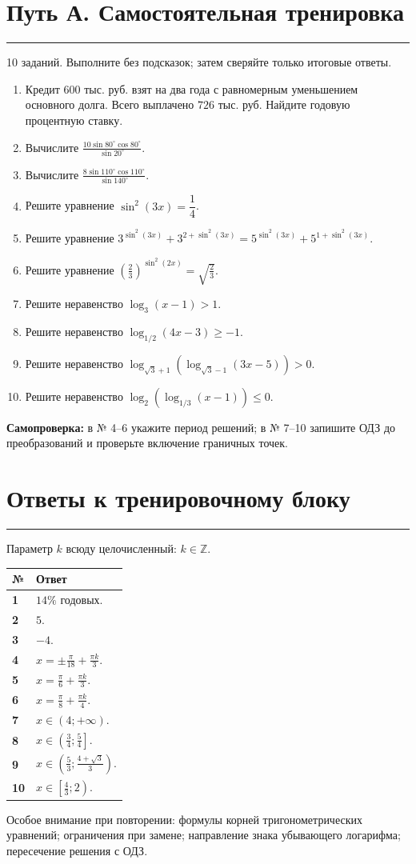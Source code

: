 \documentclass[a4paper,12pt]{article}
\newcommand{\sectionnote}[1]{{\small\color{softgray}#1\par}}
\newcommand{\lessonsection}[1]{\Needspace{5\baselineskip}\section*{\color{darkaccent}#1}\vspace{-5pt}\noindent\textcolor{accent}{\rule{25mm}{0.7pt}}\par\vspace{1pt}}
\newcommand{\Z}{\mathbb Z}
\begin{document}
\clearpage
\lessonsection{Путь А. Самостоятельная тренировка}
\sectionnote{10 заданий. Выполните без подсказок; затем сверяйте только итоговые ответы.}
\begin{enumerate}
\item Кредит \(600\) тыс. руб. взят на два года с равномерным уменьшением основного долга. Всего выплачено \(726\) тыс. руб. Найдите годовую процентную ставку.
\item Вычислите \(\displaystyle\frac{10\sin80^\circ\cos80^\circ}{\sin20^\circ}\).
\item Вычислите \(\displaystyle\frac{8\sin110^\circ\cos110^\circ}{\sin140^\circ}\).
\item Решите уравнение \(\sin^2(3x)=\dfrac14\).
\item Решите уравнение \(3^{\sin^2(3x)}+3^{2+\sin^2(3x)}=5^{\sin^2(3x)}+5^{1+\sin^2(3x)}\).
\item Решите уравнение \(\displaystyle\left(\frac23\right)^{\sin^2(2x)}=\sqrt{\frac23}\).
\item Решите неравенство \(\log_3(x-1)>1\).
\item Решите неравенство \(\log_{1/2}(4x-3)\ge-1\).
\item Решите неравенство \(\displaystyle\log_{\sqrt3+1}\!\left(\log_{\sqrt3-1}(3x-5)\right)>0\).
\item Решите неравенство \(\displaystyle\log_2\!\left(\log_{1/3}(x-1)\right)\le0\).
\end{enumerate}
\vspace{3mm}
\textbf{Самопроверка:} в № 4--6 укажите период решений; в № 7--10 запишите ОДЗ до преобразований и проверьте включение граничных точек.

\clearpage
\lessonsection{Ответы к тренировочному блоку}
\sectionnote{Параметр \(k\) всюду целочисленный: \(k\in\Z\).}
\renewcommand{\arraystretch}{1.45}
\begin{center}
\begin{tabularx}{\linewidth}{@{}>{\bfseries}p{13mm}X@{}}
\toprule
№ & Ответ \\
\midrule
1 & \(14\%\) годовых. \\
2 & \(5\). \\
3 & \(-4\). \\
4 & \(\displaystyle x=\pm\frac\pi{18}+\frac{\pi k}3\). \\
5 & \(\displaystyle x=\frac\pi6+\frac{\pi k}3\). \\
6 & \(\displaystyle x=\frac\pi8+\frac{\pi k}4\). \\
7 & \(\displaystyle x\in(4;+\infty)\). \\
8 & \(\displaystyle x\in\left(\frac34;\frac54\right]\). \\
9 & \(\displaystyle x\in\left(\frac53;\frac{4+\sqrt3}{3}\right)\). \\
10 & \(\displaystyle x\in\left[\frac43;2\right)\). \\
\bottomrule
\end{tabularx}
\end{center}
\vspace{7mm}
\textcolor{softgray}{\small Особое внимание при повторении: формулы корней тригонометрических уравнений; ограничения при замене; направление знака убывающего логарифма; пересечение решения с ОДЗ.}
\end{document}
